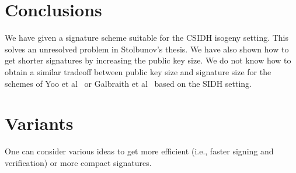 \documentclass{llncs}
\begin{document}
\section{Conclusions}


We have given a signature scheme suitable for the CSIDH isogeny setting.
This solves an unresolved problem in Stolbunov's thesis.
We have also shown how to get shorter signatures by increasing the public key size.
We do not know how to obtain a similar tradeoff between public key size and signature size for the schemes of Yoo et al~\cite{YAJJS17} or Galbraith et al~\cite{GPS17} based on the SIDH setting.







\appendix


\section{Variants}\label{sec:variants}

One can consider various ideas to get more efficient (i.e., faster signing and verification) or more compact signatures.
\end{document}

